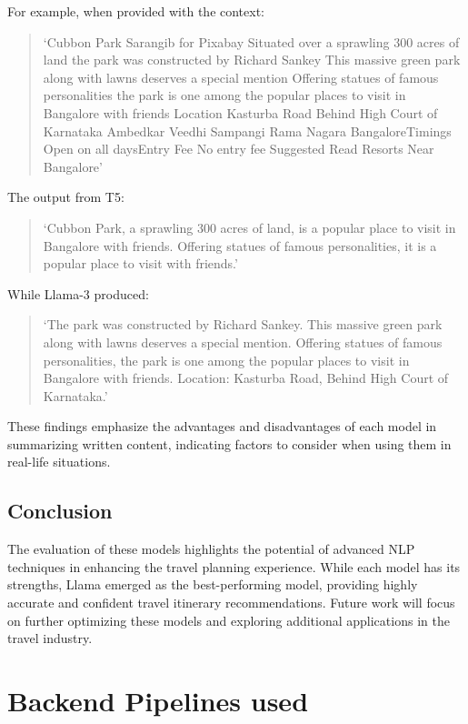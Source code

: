 \documentclass[conference]{IEEEtran}
\begin{document}
        For example, when provided with the context:
        \begin{quote}
        ‘Cubbon Park Sarangib for Pixabay Situated over a sprawling 300 acres of land the park was constructed by Richard Sankey This massive green park along with lawns deserves a special mention Offering statues of famous personalities the park is one among the popular places to visit in Bangalore with friends Location Kasturba Road Behind High Court of Karnataka Ambedkar Veedhi Sampangi Rama Nagara BangaloreTimings Open on all daysEntry Fee No entry fee Suggested Read Resorts Near Bangalore’
        \end{quote}

        The output from T5:
        \begin{quote}
        ‘Cubbon Park, a sprawling 300 acres of land, is a popular place to visit in Bangalore with friends. Offering statues of famous personalities, it is a popular place to visit with friends.’
        \end{quote}

        While Llama-3 produced:
        \begin{quote}
        ‘The park was constructed by Richard Sankey. This massive green park along with lawns deserves a special mention. Offering statues of famous personalities, the park is one among the popular places to visit in Bangalore with friends. Location: Kasturba Road, Behind High Court of Karnataka.’
        \end{quote}

    These findings emphasize the advantages and disadvantages of each model in summarizing written content, indicating factors to consider when using them in real-life situations.

    \subsection{Conclusion}

        The evaluation of these models highlights the potential of advanced NLP techniques in enhancing the travel planning experience. While each model has its strengths, Llama emerged as the best-performing model, providing highly accurate and confident travel itinerary recommendations. Future work will focus on further optimizing these models and exploring additional applications in the travel industry.

\section{Backend Pipelines used}
\end{document}
